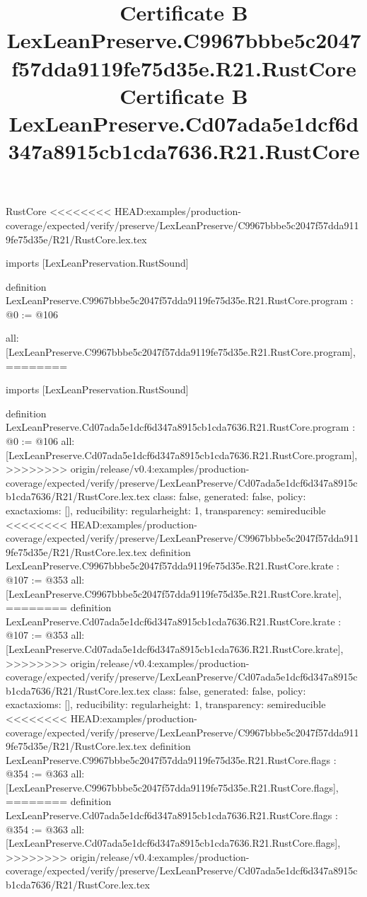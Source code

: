 \begin{lexlean}{RustCore}
<<<<<<<< HEAD:examples/production-coverage/expected/verify/preserve/LexLeanPreserve/C9967bbbe5c2047f57dda9119fe75d35e/R21/RustCore.lex.tex
\title{Certificate B LexLeanPreserve.C9967bbbe5c2047f57dda9119fe75d35e.R21.RustCore}
\begin{coremodule}
imports [LexLeanPreservation.RustSound]

definition LexLeanPreserve.C9967bbbe5c2047f57dda9119fe75d35e.R21.RustCore.program : @0 := @106 {
  all: [LexLeanPreserve.C9967bbbe5c2047f57dda9119fe75d35e.R21.RustCore.program],
========
\title{Certificate B LexLeanPreserve.Cd07ada5e1dcf6d347a8915cb1cda7636.R21.RustCore}
\begin{coremodule}
imports [LexLeanPreservation.RustSound]

definition LexLeanPreserve.Cd07ada5e1dcf6d347a8915cb1cda7636.R21.RustCore.program : @0 := @106 {
  all: [LexLeanPreserve.Cd07ada5e1dcf6d347a8915cb1cda7636.R21.RustCore.program],
>>>>>>>> origin/release/v0.4:examples/production-coverage/expected/verify/preserve/LexLeanPreserve/Cd07ada5e1dcf6d347a8915cb1cda7636/R21/RustCore.lex.tex
  class: false,
  generated: false,
  policy: exact{axioms: []},
  reducibility: regular{height: 1},
  transparency: semireducible
}
<<<<<<<< HEAD:examples/production-coverage/expected/verify/preserve/LexLeanPreserve/C9967bbbe5c2047f57dda9119fe75d35e/R21/RustCore.lex.tex
definition LexLeanPreserve.C9967bbbe5c2047f57dda9119fe75d35e.R21.RustCore.krate : @107 := @353 {
  all: [LexLeanPreserve.C9967bbbe5c2047f57dda9119fe75d35e.R21.RustCore.krate],
========
definition LexLeanPreserve.Cd07ada5e1dcf6d347a8915cb1cda7636.R21.RustCore.krate : @107 := @353 {
  all: [LexLeanPreserve.Cd07ada5e1dcf6d347a8915cb1cda7636.R21.RustCore.krate],
>>>>>>>> origin/release/v0.4:examples/production-coverage/expected/verify/preserve/LexLeanPreserve/Cd07ada5e1dcf6d347a8915cb1cda7636/R21/RustCore.lex.tex
  class: false,
  generated: false,
  policy: exact{axioms: []},
  reducibility: regular{height: 1},
  transparency: semireducible
}
<<<<<<<< HEAD:examples/production-coverage/expected/verify/preserve/LexLeanPreserve/C9967bbbe5c2047f57dda9119fe75d35e/R21/RustCore.lex.tex
definition LexLeanPreserve.C9967bbbe5c2047f57dda9119fe75d35e.R21.RustCore.flags : @354 := @363 {
  all: [LexLeanPreserve.C9967bbbe5c2047f57dda9119fe75d35e.R21.RustCore.flags],
========
definition LexLeanPreserve.Cd07ada5e1dcf6d347a8915cb1cda7636.R21.RustCore.flags : @354 := @363 {
  all: [LexLeanPreserve.Cd07ada5e1dcf6d347a8915cb1cda7636.R21.RustCore.flags],
>>>>>>>> origin/release/v0.4:examples/production-coverage/expected/verify/preserve/LexLeanPreserve/Cd07ada5e1dcf6d347a8915cb1cda7636/R21/RustCore.lex.tex
}}}
\end{coremodule}}
\end{coremodule}
\end{lexlean}
